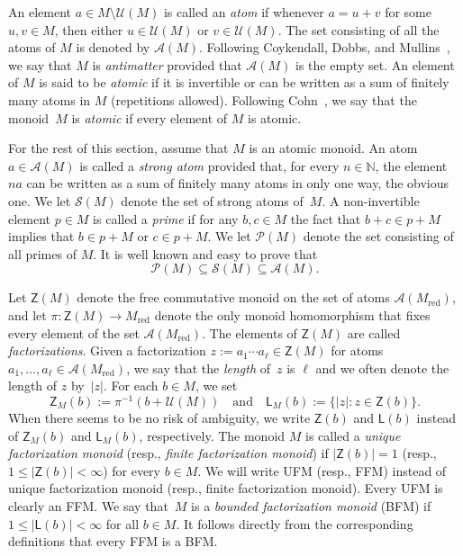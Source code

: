 \documentclass[11pt]{amsart}
\theoremstyle{definition}
\theoremstyle{remark}
\numberwithin{equation}{section}
\newcommand{\nn}{\mathbb{N}}
\newcommand{\uu}{\mathcal{U}}
\begin{document}
An element $a \in M \! \setminus \! \uu(M)$ is called an \emph{atom} if whenever $a = u+v$ for some $u,v \in M$, then either $u \in \uu(M)$ or $v \in \uu(M)$.  The set consisting of all the atoms of $M$ is denoted by $\mathcal{A}(M)$. Following Coykendall, Dobbs, and Mullins~\cite{CDM99}, we say that $M$ is \emph{antimatter} provided that $\mathcal{A}(M)$ is the empty set. An element of $M$ is said to be \emph{atomic} if it is invertible or can be written as a sum of finitely many atoms in $M$ (repetitions allowed). Following Cohn~\cite{pC68}, we say that the monoid~$M$ is \emph{atomic} if every element of $M$ is atomic. 
\smallskip

For the rest of this section, assume that $M$ is an atomic monoid. An atom $a \in \mathcal{A}(M)$ is called a \emph{strong atom} provided that, for every $n \in \nn$, the element $na$ can be written as a sum of finitely many atoms in only one way, the obvious one. We let $\mathcal{S}(M)$ denote the set of strong atoms of~$M$. A non-invertible element $p \in M$ is called a \emph{prime} if for any $b,c \in M$ the fact that $b+c \in p + M$ implies that $b \in p + M$ or $c \in p + M$. We let $\mathcal{P}(M)$ denote the set consisting of all primes of $M$. It is well known and easy to prove that
\[
    \mathcal{P}(M) \subseteq \mathcal{S}(M) \subseteq \mathcal{A}(M).
\]

Let $\mathsf{Z}(M)$ denote the free commutative monoid on the set of atoms $\mathcal{A}(M_{\text{red}})$, and let $\pi \colon \mathsf{Z}(M) \to M_\text{red}$ denote the only monoid homomorphism that fixes every element of the set $\mathcal{A}(M_{\text{red}})$. The elements of $\mathsf{Z}(M)$ are called \emph{factorizations}. Given a factorization $z := a_1 \cdots a_\ell \in \mathsf{Z}(M)$ for atoms $a_1, \dots, a_\ell \in \mathcal{A}(M_{\text{red}})$, we say that the \emph{length} of~$z$ is $\ell$ and we often denote the length of $z$ by~$|z|$. For each $b \in M$, we set
\[
	\mathsf{Z}_M(b) := \pi^{-1} (b + \uu(M)) \quad  \text{and}  \quad  \mathsf{L}_M(b) := \{ |z| : z \in \mathsf{Z}(b) \}.
\]
When there seems to be no risk of ambiguity, we write $\mathsf{Z}(b)$ and $\mathsf{L}(b)$ instead of $\mathsf{Z}_M(b)$ and $\mathsf{L}_M(b)$, respectively. The monoid $M$ is called a \emph{unique factorization monoid} (resp., \emph{finite factorization monoid}) if $|\mathsf{Z}(b)| = 1$ (resp., $1 \le |\mathsf{Z}(b)| < \infty$) for every $b \in M$. We will write UFM (resp., FFM) instead of unique factorization monoid (resp., finite factorization monoid). Every UFM is clearly an FFM. We say that~$M$ is a \emph{bounded factorization monoid} (BFM) if $1 \le |\mathsf{L}(b)| < \infty$ for all $b \in M$. It follows directly from the corresponding definitions that every FFM is a BFM.
\end{document}

